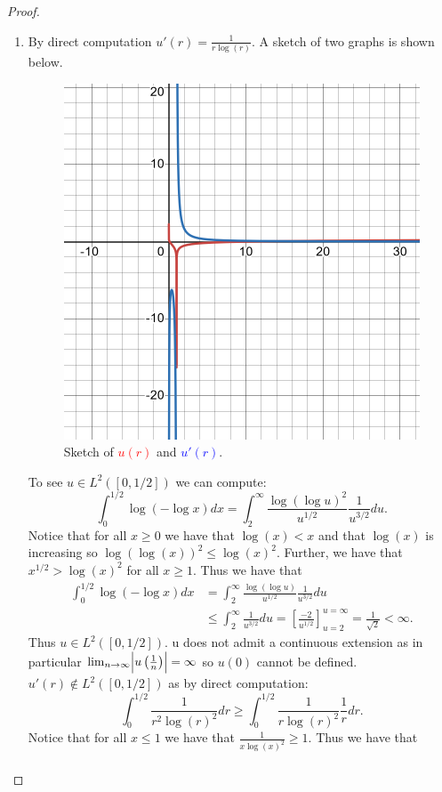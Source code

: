 \documentclass{amsart}
\theoremstyle{plain}
\theoremstyle{definition}
\begin{document}
\begin{proof}
    \begin{enumerate}[label=\alph*.]
        \item By direct computation $u'(r) = \frac{1}{r\log(r)}$. A sketch of two graphs is shown below.
        \begin{figure}[h!]
            \centering
            \includegraphics[width=0.5\linewidth]{Exercises/Chapter 1/Photos/Problem12A.png}
            \caption{Sketch of \textcolor{red}{$u(r)$} and \textcolor{blue}{$u'(r)$}.}
            \label{fig:12a}
        \end{figure}
        To see $u\in L^2([0,1/2])$ we can compute:
        $$\int_0^{1/2} \log\left(-\log x\right) dx = \int_{2}^{\infty} \frac{\log\left(\log u\right)^2}{u^{1/2}}\frac{1}{u^{3/2}}du.$$ Notice that for all $x\geq 0$ we have that $\log(x) < x$ and that $\log(x)$ is increasing so $\log(\log(x))^2 \leq \log(x)^2.$ 
        Further, we have that $x^{1/2} > \log(x)^2$ for all $x\geq 1$. Thus we have that
        \begin{align*}
            \int_0^{1/2} \log\left(-\log x\right) dx &= \int_{2}^{\infty} \frac{\log\left(\log u\right)}{u^{1/2}}\frac{1}{u^{3/2}}du\\
            &\leq \int_2^\infty \frac{1}{u^{3/2}} du = \left[\frac{-2}{u^{1/2}}\right]_{u=2}^{u=\infty} =  \frac{1}{\sqrt{2}} < \infty.
        \end{align*}
        Thus $u\in L^2([0,1/2]).$ u does not admit a continuous extension as in particular $\lim_{n\to\infty} \abs{u\left(\frac{1}{n}\right)} = \infty$ so $u(0)$ cannot be defined. $u'(r)\not \in L^2([0,1/2])$ as by direct computation:
        $$\int_{0}^{1/2} \frac{1}{r^2\log(r)^2} dr \geq \int_{0}^{1/2} \frac{1}{r\log(r)^2} \frac{1}{r}dr.$$
        Notice that for all $x\leq 1$ we have that
        $\frac{1}{x\log(x)^2} \geq 1.$ Thus we have that 
        \begin{align*}

\end{align*}
\end{enumerate}
\end{proof}
\end{document}

